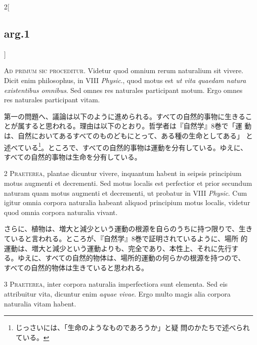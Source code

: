 \documentclass[paper=a4paper,fontsize=10pt,jafontsize=9pt,titlepage]{jlreq}
\begin{document}
\begin{paracol}{2}[\subsection{arg.1}]


{\huge A}{\scshape d primum sic proceditur}. Videtur quod omnium rerum
 naturalium sit vivere. Dicit enim philosophus, in VIII {\itshape Physic}., quod
 motus est {\itshape ut vita quaedam natura existentibus omnibus}. Sed omnes res
 naturales participant motum. Ergo omnes res naturales participant
 vitam.

\switchcolumn

第一の問題へ、議論は以下のように進められる。すべての自然的事物に生きるこ
 とが属すると思われる。理由は以下のとおり。哲学者は『自然学』8巻で「運
 動は、自然においてあるすべてのものどもにとって、ある種の生命としてある」
 と述べている\footnote{じっさいには、「生命のようなものであろうか」と疑
 問のかたちで述べられている。}。ところで、すべての自然的事物は運動を分有している。ゆえに、
 すべての自然的事物は生命を分有している。



{\scshape 2 Praeterea}, plantae dicuntur vivere, inquantum habent in
 seipsis principium motus augmenti et decrementi. Sed motus localis est
 perfectior et prior secundum naturam quam motus augmenti et decrementi,
 ut probatur in VIII {\itshape Physic}. Cum igitur omnia corpora naturalia habeant
 aliquod principium motus localis, videtur quod omnia corpora naturalia
 vivant.

\switchcolumn

さらに、植物は、増大と減少という運動の根源を自らのうちに持つ限りで、生き
 ていると言われる。ところが、『自然学』8巻で証明されているように、場所
 的運動は、増大と減少という運動よりも、完全であり、本性上、それに先行す
 る。ゆえに、すべての自然的物体は、場所的運動の何らかの根源を持つので、
 すべての自然的物体は生きていると思われる。



{\scshape 3 Praeterea}, inter corpora naturalia imperfectiora sunt
 elementa. Sed eis attribuitur vita, dicuntur enim {\itshape aquae vivae}. Ergo
 multo magis alia corpora naturalia vitam habent.


\end{paracol}
\end{document}
